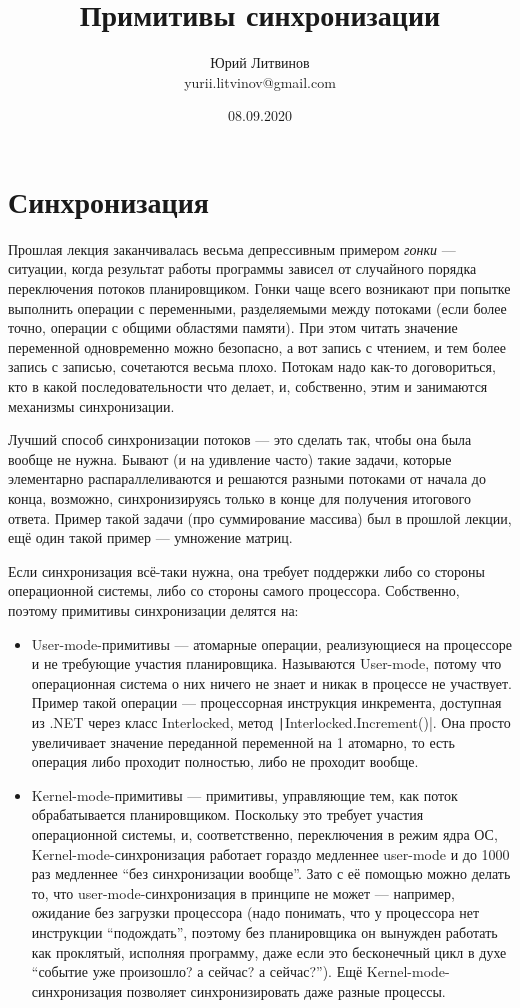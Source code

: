 \documentclass[a5paper]{article}
\title{Примитивы синхронизации}
\author{Юрий Литвинов\\\small{yurii.litvinov@gmail.com}}
\date{08.09.2020}
\begin{document}
\maketitle
\thispagestyle{empty}

\section{Синхронизация}

Прошлая лекция заканчивалась весьма депрессивным примером \textit{гонки} --- ситуации, когда результат работы программы зависел от случайного порядка переключения потоков планировщиком. Гонки чаще всего возникают при попытке выполнить операции с переменными, разделяемыми между потоками (если более точно, операции с общими областями памяти). При этом читать значение переменной одновременно можно безопасно, а вот запись с чтением, и тем более запись с записью, сочетаются весьма плохо. Потокам надо как-то договориться, кто в какой последовательности что делает, и, собственно, этим и занимаются механизмы синхронизации.

Лучший способ синхронизации потоков --- это сделать так, чтобы она была вообще не нужна. Бывают (и на удивление часто) такие задачи, которые элементарно распараллеливаются и решаются разными потоками от начала до конца, возможно, синхронизируясь только в конце для получения итогового ответа. Пример такой задачи (про суммирование массива) был в прошлой лекции, ещё один такой пример --- умножение матриц.

Если синхронизация всё-таки нужна, она требует поддержки либо со стороны операционной системы, либо со стороны самого процессора. Собственно, поэтому примитивы синхронизации делятся на:

\begin{itemize}
    \item User-mode-примитивы --- атомарные операции, реализующиеся на процессоре и не требующие участия планировщика. Называются User-mode, потому что операционная система о них ничего не знает и никак в процессе не участвует. Пример такой операции --- процессорная инструкция инкремента, доступная из .NET через класс Interlocked, метод \texttt|Interlocked.Increment()|. Она просто увеличивает значение переданной переменной на 1 атомарно, то есть операция либо проходит полностью, либо не проходит вообще.
    \item Kernel-mode-примитивы --- примитивы, управляющие тем, как поток обрабатывается планировщиком. Поскольку это требует участия операционной системы, и, соответственно, переключения в режим ядра ОС, Kernel-mode-синхронизация работает гораздо медленнее user-mode и до 1000 раз медленнее ``без синхронизации вообще''. Зато с её помощью можно делать то, что user-mode-синхронизация в принципе не может --- например, ожидание без загрузки процессора (надо понимать, что у процессора нет инструкции ``подождать'', поэтому без планировщика он вынужден работать как проклятый, исполняя программу, даже если это бесконечный цикл в духе ``событие уже произошло? а сейчас? а сейчас?''). Ещё Kernel-mode-синхронизация позволяет синхронизировать даже разные процессы.
\end{itemize}
\end{document}
